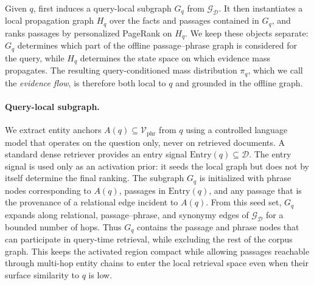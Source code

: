 Given $q$, \methodname{} first induces a query-local subgraph $G_q$ from
$\mathcal{G}_{\mathcal{D}}$. It then instantiates a local propagation
graph $H_q$ over the facts and passages contained in $G_q$, and ranks
passages by personalized PageRank on $H_q$. We keep these objects
separate: $G_q$ determines which part of the offline passage--phrase
graph is considered for the query, while $H_q$ determines the state space
on which evidence mass propagates. The resulting query-conditioned mass
distribution $\pi_q$, which we call the \emph{evidence flow}, is
therefore both local to $q$ and grounded in the offline graph.

\paragraph{Query-local subgraph.}
We extract entity anchors $A(q) \subseteq \mathcal{V}_{\mathrm{phr}}$
from $q$ using a controlled language model that operates on the question
only, never on retrieved documents. A standard dense retriever provides
an entry signal $\mathrm{Entry}(q) \subseteq \mathcal{D}$. The entry
signal is used only as an activation prior: it seeds the local graph but
does not by itself determine the final ranking. The subgraph $G_q$ is
initialized with phrase nodes corresponding to $A(q)$, passages in
$\mathrm{Entry}(q)$, and any passage that is the provenance of a
relational edge incident to $A(q)$. From this seed set, $G_q$ expands
along relational, passage--phrase, and synonymy edges of
$\mathcal{G}_{\mathcal{D}}$ for a bounded number of hops. Thus $G_q$
contains the passage and phrase nodes that can participate in query-time
retrieval, while excluding the rest of the corpus graph. This keeps the
activated region compact while allowing passages reachable through
multi-hop entity chains to enter the local retrieval space even when
their surface similarity to $q$ is low.

